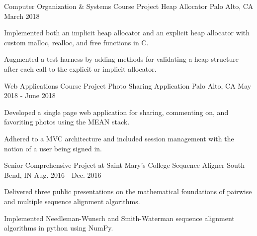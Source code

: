 \begin{cventries}

  \cventry
    {Computer Organization \& Systems Course Project}
    {Heap Allocator}
    {Palo Alto, CA}
    {March 2018}
    {
      \begin{cvitems}
        \item {Implemented both an implicit heap allocator and an explicit heap allocator with custom malloc, realloc, and free functions in C.}
        \item {Augmented a test harness by adding methods for validating a heap structure after each call to the explicit or implicit allocator.}
      \end{cvitems} 
    }

  \cventry
    {Web Applications Course Project}
    {Photo Sharing Application}
    {Palo Alto, CA}
    {May 2018 - June 2018}
    {
      \begin{cvitems}
        \item {Developed a single page web application for sharing, commenting on, and favoriting photos using the MEAN stack.}
        \item {Adhered to a MVC architecture and included session management with the notion of a user being signed in.}
      \end{cvitems} 
    }

  \cventry
    {Senior Comprehensive Project at Saint Mary's College}
    {Sequence Aligner}
    {South Bend, IN}
    {Aug. 2016 - Dec. 2016}
    {
      \begin{cvitems}
        \item {Delivered three public presentations on the mathematical foundations of pairwise and multiple sequence alignment algorithms.}
        \item {Implemented Needleman-Wunsch and Smith-Waterman sequence alignment algorithms in python using NumPy.}
      \end{cvitems} 
    }
    
\end{cventries}